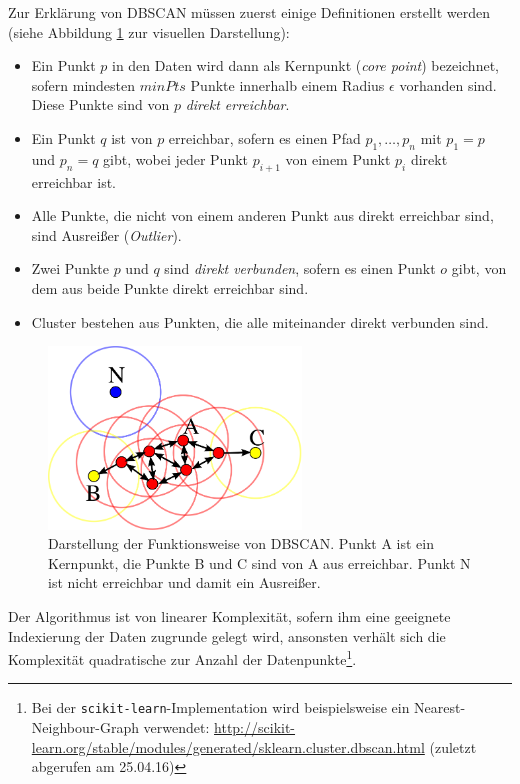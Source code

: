 Zur Erklärung von DBSCAN müssen zuerst einige Definitionen erstellt werden (siehe Abbildung \ref{fig:dbscan} zur visuellen
Darstellung):
\begin{itemize}
  \item Ein Punkt $p$ in den Daten wird dann als
  Kernpunkt (\emph{core point}) bezeichnet, sofern mindesten $minPts$ Punkte innerhalb einem Radius $\epsilon$ vorhanden sind.\\
  Diese Punkte sind von $p$ \emph{direkt erreichbar}.
  \item Ein Punkt $q$ ist von $p$ erreichbar, sofern es einen Pfad $p_1, \ldots, p_n$ mit $p_1 = p$ und $p_n = q$ gibt, wobei
  jeder Punkt $p_{i+1}$ von einem Punkt $p_i$ direkt erreichbar ist.
  \item Alle Punkte, die nicht von einem anderen Punkt aus direkt erreichbar sind, sind Ausreißer (\emph{Outlier}).
  \item Zwei Punkte $p$ und $q$ sind \emph{direkt verbunden}, sofern es einen Punkt $o$ gibt,
  von dem aus beide Punkte direkt erreichbar sind.
  \item Cluster bestehen aus Punkten, die alle miteinander direkt verbunden sind.
\end{itemize}

\begin{figure}[h]
  \centering
  \includegraphics[width=0.6\textwidth]{../img/DBSCAN-Illustration.png}
  \caption[Darstellung der Funktionsweise von DBSCAN]{Darstellung der Funktionsweise von DBSCAN. Punkt A ist ein Kernpunkt, die
  Punkte B und C sind von A aus erreichbar. Punkt N ist nicht erreichbar und damit ein Ausreißer.\label{fig:dbscan}\footnotemark}
\end{figure}

Der Algorithmus ist von linearer Komplexität, sofern ihm eine geeignete Indexierung der Daten zugrunde gelegt wird, ansonsten
verhält sich die Komplexität quadratische zur Anzahl der Datenpunkte\footnote{Bei der
\verb|scikit-learn|-Implementation wird beispielsweise ein Nearest-Neighbour-Graph verwendet:
\url{http://scikit-learn.org/stable/modules/generated/sklearn.cluster.dbscan.html} (zuletzt abgerufen am 25.04.16)}.

